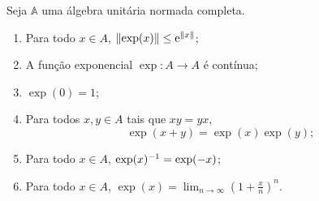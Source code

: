 \begin{proposition}
Seja $\mathbb A$ uma álgebra unitária normada completa.
	\begin{enumerate}
	\item Para todo $x \in A$, $\left\Vert{\exp(x)}\right\Vert \leq \mathrm{e}^{\left\Vert{x}\right\Vert}$;
	\item A função exponencial $\exp\colon A \to A$ é contínua;
	\item $\exp(0) = 1$;
	\item Para todos $x,y \in A$ tais que $xy=yx$,
		\begin{equation*}
		\exp(x+y) = \exp(x)\exp(y);
		\end{equation*}
	\item Para todo $x \in A$, $\exp(x)^{-1} = \exp(-x)$;
	\item Para todo $x \in A$, $\exp(x) = \lim_{n \to \infty} \left( 1 + \frac{x}{n} \right)^n$.
	\end{enumerate}
\end{proposition}
